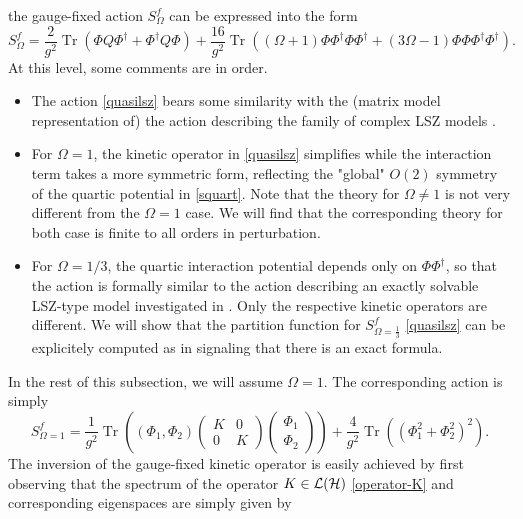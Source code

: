 \documentclass[a4paper,11pt,twoside]{article}
\numberwithin{equation}{section}
\DeclareMathOperator{\tr}{Tr}
\theoremstyle{nonumberplain}
\newcounter{and}
\begin{document}
%
the gauge-fixed action $S^f_\Omega$ can be expressed into the form%
%
\begin{equation}
S^f_\Omega = \frac{2}{g^2} \tr\left( \Phi Q \Phi^\dag + \Phi^\dag Q\Phi \right) + \frac{16}{g^2} \tr\left( (\Omega+1) \Phi\Phi^\dag\Phi\Phi^\dag + (3\Omega-1) \Phi\Phi\Phi^\dag\Phi^\dag \right) .
\label{quasilsz}
\end{equation}
%
At this level, some comments are in order.
\begin{itemize}
%
\item The action \eqref{quasilsz} bears some similarity with the (matrix model representation of) the action describing the family of complex LSZ models \cite{LSZ}.%
%
\item For $\Omega=1$, the kinetic operator in \eqref{quasilsz} simplifies while the interaction term takes a more symmetric form, reflecting the "global" $O(2)$ symmetry of the quartic potential in \eqref{squart}. Note that the theory for $\Omega\ne 1$ is not very different from the $\Omega=1$ case. We will find that the corresponding theory for both case is finite to all orders in perturbation.%
%
\item For $\Omega=1/3$, the quartic interaction potential depends only on $\Phi\Phi^\dag$, so that the action is formally similar to the action describing an exactly solvable LSZ-type model investigated in \cite{LSZ}. Only the respective kinetic operators are different. We will show that the partition function for $S^f_{\Omega=\frac{1}{3}}$ \eqref{quasilsz} can be explicitely computed as in \cite{LSZ} signaling that there is an exact formula.%
%
\end{itemize}
%
In the rest of this subsection, we will assume $\Omega=1$. The corresponding action is simply%
%
\begin{equation}
S^f_{\Omega=1} = \frac{1}{g^2} \tr\left( (\Phi_1,\Phi_2)
\begin{pmatrix}
K&0\\
0&K
\end{pmatrix} 
\begin{pmatrix}
\Phi_1\\
\Phi_2
\end{pmatrix} 
\right)
+ \frac{4}{g^2} \tr\left( (\Phi_1^2 + \Phi_2^2)^2 \right) . \label{critical-action}
\end{equation}
%
The inversion of the gauge-fixed kinetic operator is easily achieved by first observing that the spectrum of the operator $K\in{\cal{L}}({\cal{H}})$ \eqref{operator-K} and corresponding eigenspaces are simply given by%
\end{document}
